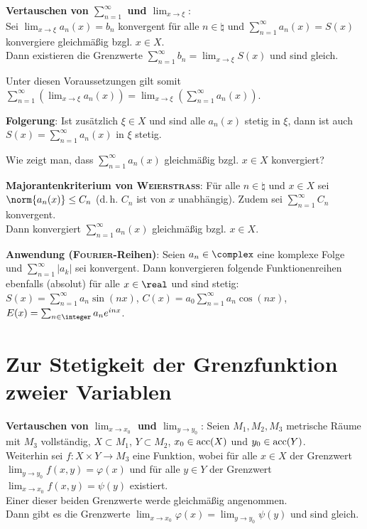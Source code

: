 \textbf{Vertauschen von $\sum_{n=1}^\infty$ und $\lim_{x \to \xi}$}: \\
Sei $\lim_{x \to \xi} a_n(x) = b_n$ konvergent für alle $n \in \natural$ und
$\sum_{n=1}^\infty a_n(x) = S(x)$ konvergiere gleichmäßig bzgl. $x \in X$. \\
Dann existieren die Grenzwerte
$\sum_{n=1}^\infty b_n = \lim_{x \to \xi} S(x)$ und sind gleich.

Unter diesen Voraussetzungen gilt somit
$\sum_{n=1}^\infty \left(\lim_{x \to \xi} a_n(x)\right) =
\lim_{x \to \xi} \left(\sum_{n=1}^\infty a_n(x)\right)$.

\textbf{Folgerung}: Ist zusätzlich $\xi \in X$ und sind alle $a_n(x)$
stetig in $\xi$, dann ist auch \\
$S(x) = \sum_{n=1}^\infty a_n(x)$ in $\xi$ stetig.

\linie

Wie zeigt man, dass $\sum_{n=1}^\infty a_n(x)$ gleichmäßig bzgl. $x \in X$
konvergiert?

\textbf{Majorantenkriterium von \textsc{Weierstrass}}:
Für alle $n \in \natural$ und $x \in X$ sei $\norm{a_n(x)} \le C_n$
(d.\,h. $C_n$ ist von $x$ unabhängig).
Zudem sei $\sum_{n=1}^\infty C_n$ konvergent. \\
Dann konvergiert $\sum_{n=1}^\infty a_n(x)$ gleichmäßig bzgl. $x \in X$.

\textbf{Anwendung (\textsc{Fourier}-Reihen)}:
Seien $a_n \in \complex$ eine komplexe Folge und $\sum_{n=1}^\infty |a_k|$
sei konvergent.
Dann konvergieren folgende Funktionenreihen ebenfalls (absolut) für alle
$x \in \real$ und sind stetig:
$S(x) = \sum_{n=1}^\infty a_n \sin(nx)$,
$C(x) = a_0 \sum_{n=1}^\infty a_n \cos(nx)$,
$E(x) = \sum_{n \in \integer} a_n e^{inx}$.

\pagebreak

\section{%
    Zur Stetigkeit der Grenzfunktion zweier Variablen%
}

\textbf{Vertauschen von $\lim_{x \to x_0}$ und $\lim_{y \to y_0}$}:
Seien $M_1, M_2, M_3$ metrische Räume mit $M_3$ vollständig,
$X \subset M_1$, $Y \subset M_2$, $x_0 \in \operatorname{acc}(X)$ und $y_0 \in \operatorname{acc}(Y)$. \\
Weiterhin sei $f: X \times Y \rightarrow M_3$ eine Funktion, wobei
für alle $x \in X$ der Grenzwert \\
$\lim_{y \to y_0} f(x, y) = \varphi(x)$
und für alle $y \in Y$ der Grenzwert $\lim_{x \to x_0} f(x, y) = \psi(y)$
existiert. \\
Einer dieser beiden Grenzwerte werde gleichmäßig angenommen. \\
Dann gibt es die Grenzwerte
$\lim_{x \to x_0} \varphi(x) = \lim_{y \to y_0} \psi(y)$ und sind gleich.

